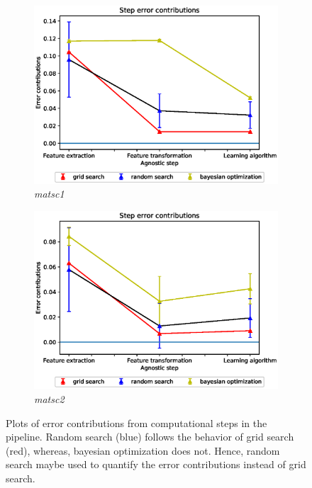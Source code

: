 \begin{figure}[ht!]
\begin{subfigure}{.5\textwidth}
  \includegraphics[scale=0.37]{img/EP/agnostic_error_steps_matsc_dataset1.eps}
  \caption{\textit{matsc1}}
  \label{fig:eq_steps_matsc1}
\end{subfigure}%
\begin{subfigure}{.5\textwidth}
  \centering
  \includegraphics[scale=0.37]{img/EP/agnostic_error_steps_matsc_dataset2.eps}
  \caption{\textit{matsc2}}
  \label{fig:eq_steps_matsc2}
\end{subfigure}
\caption{Plots of error contributions from computational steps in the pipeline. Random search (blue) follows the behavior of grid search (red), whereas, bayesian optimization does not. Hence, random search maybe used to quantify the error contributions instead of grid search.}
\label{fig:eq_steps}
\end{figure}

